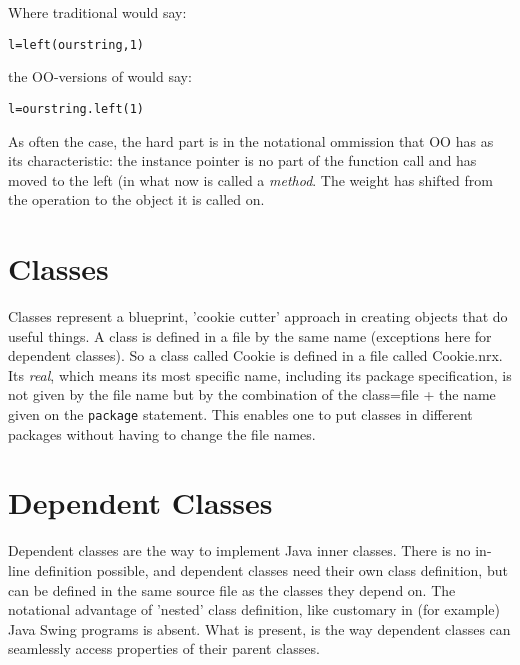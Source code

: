 {Where traditional \Rexx{} would say:
\begin{alltt}
l=left(ourstring,1)
\end{alltt}
the OO-versions of \Rexx{} would say:
\begin{alltt}
l=ourstring.left(1)
\end{alltt}
As often the case, the hard part is in the notational ommission that
OO has as its characteristic: the instance pointer is no part of the
function call and has moved to the left (in what now is called a
\emph{method}. The weight has shifted from the operation to the object
it is called on.
\section{Classes}
Classes represent a blueprint, 'cookie cutter' approach in creating
objects that do useful things. A class is defined in a file by the
same name (exceptions here for dependent classes). So a class called
Cookie is defined in a file called Cookie.nrx. Its \emph{real}, which
means its most specific name, including its package specification, is
not given by the file name but by the combination of the class=file +
the name given on the \texttt{package} statement. This enables one to
put classes in different packages without having to change the file
names.

\section{Dependent Classes}
Dependent classes are the \nr{} way to implement Java inner
classes. There is no in-line definition possible, and dependent
classes need their own class definition, but can be defined in the
same source file as the classes they depend on. The notational
advantage of 'nested' class definition, like customary in (for
example) Java Swing programs is absent. What is present, is the way
dependent classes can seamlessly access properties of their parent classes.
}
